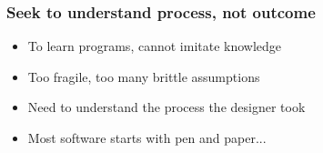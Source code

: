 \documentclass{beamer}
\begin{document}
    \begin{frame}
        \frametitle{Seek to understand process, not outcome}
        \begin{itemize}
            \item To learn programs, cannot imitate knowledge
            \item Too fragile, too many brittle assumptions
            \item Need to understand the process the designer took
            \item Most software starts with pen and paper...
        \end{itemize}
        \begin{figure}[H]
            \centering


        \end{figure}
    \end{frame}
\end{document}
